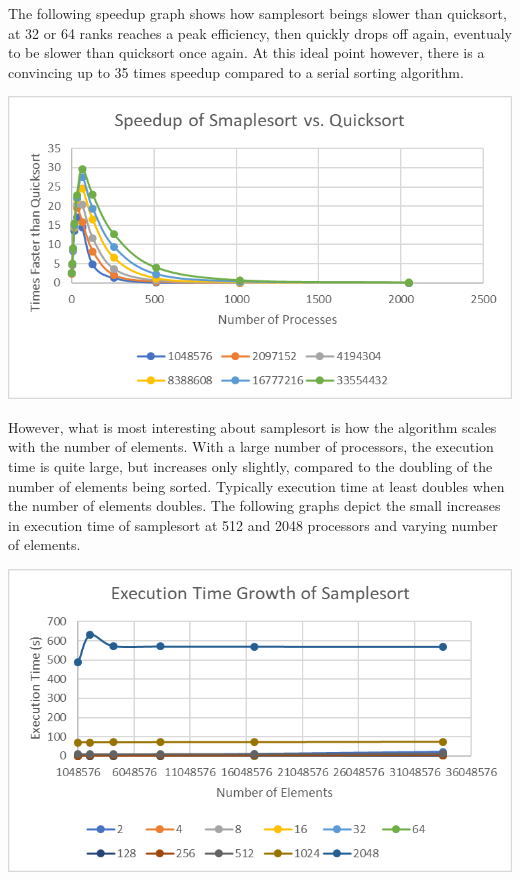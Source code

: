 \documentclass[10pt,letterpaper]{article}
\begin{document}
\begin{multicols}{2}
The following speedup graph shows how samplesort beings slower than quicksort, at 32 or 64 ranks reaches a peak efficiency, then quickly drops off again, eventualy to be slower than quicksort once again. At this ideal point however, there is a convincing up to 35 times speedup compared to a serial sorting algorithm.

\begin{center}
\includegraphics[scale=1.3]{sample_speedup}
\end{center}

However, what is most interesting about samplesort is how the algorithm scales with the number of elements. With a large number of processors, the execution time is quite large, but increases only slightly, compared to the doubling of the number of elements being sorted. Typically execution time at least doubles when the number of elements doubles. The following graphs depict the small increases in execution time of samplesort at 512 and 2048 processors and varying number of elements.

\begin{center}
\includegraphics[scale=1.3]{sample_growth}
\end{center}


\end{multicols}
\end{document}

